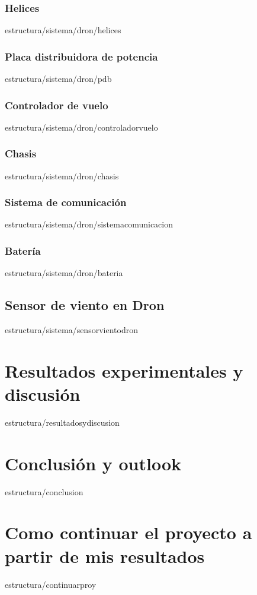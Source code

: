 \documentclass[epsbased,copyright,final,printable,covers,extendedindex,firstnumbered,tfg,gnuplot]{tfgtfmthesisuam}
\begin{document}
		\subsection{Helices\label{SS:HELICES}}{estructura/sistema/dron/helices}
		\subsection{Placa distribuidora de potencia\label{SS:PDB}}{estructura/sistema/dron/pdb}
		\subsection{Controlador de vuelo\label{SS:CONTROLADORVUELO}}{estructura/sistema/dron/controladorvuelo}
		\subsection{Chasis\label{SS:CHASIS}}{estructura/sistema/dron/chasis}
		\subsection{Sistema de comunicación\label{SS:SISTCOMUNICACION}}{estructura/sistema/dron/sistemacomunicacion}
		\subsection{Batería\label{SS:BATERIA}}{estructura/sistema/dron/bateria}
	\section{Sensor de viento en Dron\label{SEC:SENSORVIENTODRON}}{estructura/sistema/sensorvientodron}

\chapter{Resultados experimentales y discusión\label{CAP:RESEXPYDISC}}{estructura/resultadosydiscusion}

\chapter{Conclusión y outlook\label{CAP:CONCLUSION}}{estructura/conclusion}

\chapter{Como continuar el proyecto a partir de mis resultados\label{CAP:COTNINUARPROY}}{estructura/continuarproy}
\end{document}
